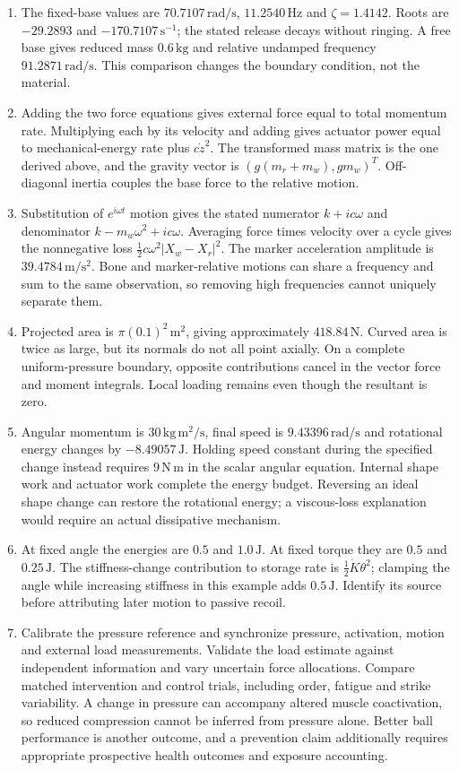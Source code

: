 \begin{enumerate}[leftmargin=*]
\item The fixed-base values are $70.7107\,\mathrm{rad/s}$, $11.2540\,\mathrm{Hz}$ and $\zeta=1.4142$. Roots are $-29.2893$ and $-170.7107\,\mathrm{s^{-1}}$; the stated release decays without ringing. A free base gives reduced mass $0.6\,\mathrm{kg}$ and relative undamped frequency $91.2871\,\mathrm{rad/s}$. This comparison changes the boundary condition, not the material.
\item Adding the two force equations gives external force equal to total momentum rate. Multiplying each by its velocity and adding gives actuator power equal to mechanical-energy rate plus $c\dot z^2$. The transformed mass matrix is the one derived above, and the gravity vector is $(g(m_r+m_w),gm_w)^T$. Off-diagonal inertia couples the base force to the relative motion.
\item Substitution of $e^{i\omega t}$ motion gives the stated numerator $k+ic\omega$ and denominator $k-m_w\omega^2+ic\omega$. Averaging force times velocity over a cycle gives the nonnegative loss $\tfrac12c\omega^2|X_w-X_r|^2$. The marker acceleration amplitude is $39.4784\,\mathrm{m/s^2}$. Bone and marker-relative motions can share a frequency and sum to the same observation, so removing high frequencies cannot uniquely separate them.
\item Projected area is $\pi(0.1)^2\,\mathrm{m^2}$, giving approximately $418.84\,\mathrm N$. Curved area is twice as large, but its normals do not all point axially. On a complete uniform-pressure boundary, opposite contributions cancel in the vector force and moment integrals. Local loading remains even though the resultant is zero.
\item Angular momentum is $30\,\mathrm{kg\,m^2/s}$, final speed is $9.43396\,\mathrm{rad/s}$ and rotational energy changes by $-8.49057\,\mathrm J$. Holding speed constant during the specified change instead requires $9\,\mathrm{N\,m}$ in the scalar angular equation. Internal shape work and actuator work complete the energy budget. Reversing an ideal shape change can restore the rotational energy; a viscous-loss explanation would require an actual dissipative mechanism.
\item At fixed angle the energies are $0.5$ and $1.0\,\mathrm J$. At fixed torque they are $0.5$ and $0.25\,\mathrm J$. The stiffness-change contribution to storage rate is $\tfrac12\dot K\theta^2$; clamping the angle while increasing stiffness in this example adds $0.5\,\mathrm J$. Identify its source before attributing later motion to passive recoil.
\item Calibrate the pressure reference and synchronize pressure, activation, motion and external load measurements. Validate the load estimate against independent information and vary uncertain force allocations. Compare matched intervention and control trials, including order, fatigue and strike variability. A change in pressure can accompany altered muscle coactivation, so reduced compression cannot be inferred from pressure alone. Better ball performance is another outcome, and a prevention claim additionally requires appropriate prospective health outcomes and exposure accounting.
\end{enumerate}
